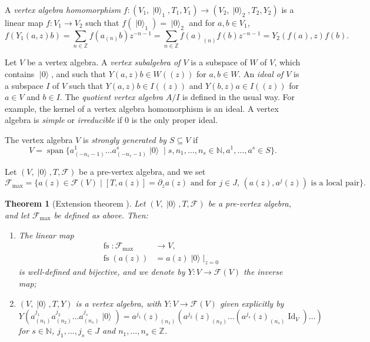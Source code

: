 \documentclass[a4paper, 12pt, reqno]{amsart}
\newtheorem{theorem}{Theorem}[section]
\theoremstyle{remark}
\DeclareMathOperator{\vac}{|0\rangle}
\DeclareMathOperator{\vspan}{span}
\DeclareMathOperator{\Id}{Id}
\DeclareMathOperator{\fs}{fs}
\begin{document}
A \emph{vertex algebra homomorphism} $f: (V_1, \vac_1, T_1, Y_1) \to (V_2, \vac_2, T_2, Y_2)$ is a linear map $f: V_1 \to V_2$ such that $f(\vac_1) = \vac_2$ and for $a, b \in V_1$,
\begin{equation*}
  f(Y_1(a, z)b) = \sum_{n \in \mathbb{Z}}f(a_{(n)}b)z^{-n - 1} = \sum_{n \in \mathbb{Z}}f(a)_{(n)}f(b)z^{-n - 1} = Y_2(f(a), z)f(b).
\end{equation*}

Let $V$ be a vertex algebra.
A \emph{vertex subalgebra of $V$} is a subspace of $W$ of $V$, which contains $\vac$, and such that $Y(a, z)b \in W((z))$ for $a, b \in W$.
An \emph{ideal of $V$} is a subspace $I$ of $V$ such that $Y(a, z)b \in I((z))$ and $Y(b, z)a \in I((z))$ for $a \in V$ and $b \in I$.
The \emph{quotient vertex algebra} $A/I$ is defined in the usual way.
For example, the kernel of a vertex algebra homomorphism is an ideal.
A vertex algebra is \emph{simple} or \emph{irreducible} if $0$ is the only proper ideal.

The vertex algebra $V$ is \emph{strongly generated by $S \subseteq V$} if
\begin{equation*}
  V = \vspan\{a^1_{(-n_1 - 1)}\dots a^s_{(-n_s - 1)}\vac \mid s, n_1, \dots, n_s \in \mathbb{N}, a^1, \dots, a^s \in S\}.
\end{equation*}

Let $(V, \vac, T, \mathcal{F})$ be a pre-vertex algebra, and we set
\begin{equation*}
  \mathcal{F}_{\max} = \{a(z) \in \mathcal{F}(V) \mid \text{$[T, a(z)] = \partial_za(z)$ and for $j \in J$, $(a(z), a^j(z))$ is a local pair}\}.
\end{equation*}

\begin{theorem}[Extension theorem {\cite[Theorem 1]{callegaro_introduction_2017-1}}]
  \label{thr:4}
  Let $(V, \vac, T, \mathcal{F})$ be a pre-vertex algebra, and let $\mathcal{F}_{\max}$ be defined as above.
  Then:
  \begin{enumerate}
  \item The linear map
    \begin{align*}
      \fs: \mathcal{F}_{\max} &\to V, \\
      \fs(a(z)) &= a(z)\vac|_{z = 0}
    \end{align*}
    is well-defined and bijective, and we denote by $Y: V \to \mathcal{F}(V)$ the inverse map;
  \item $(V, \vac, T, Y)$ is a vertex algebra, with $Y: V \to \mathcal{F}(V)$ given explicitly by
    \begin{equation*}
      Y(a^{j_1}_{(n_1)}a^{j_2}_{(n_2)}\dots a^{j_s}_{(n_s)}\vac) = a^{j_1}(z)_{(n_1)}(a^{j_2}(z)_{(n_2)}\dots(a^{j_s}(z)_{(n_s)}\Id_V)\dots)
    \end{equation*}
    for $s \in \mathbb{N}$, $j_1, \dots, j_s \in J$ and $n_1, \dots, n_s \in \mathbb{Z}$.
  \end{enumerate}
\end{theorem}
\end{document}
